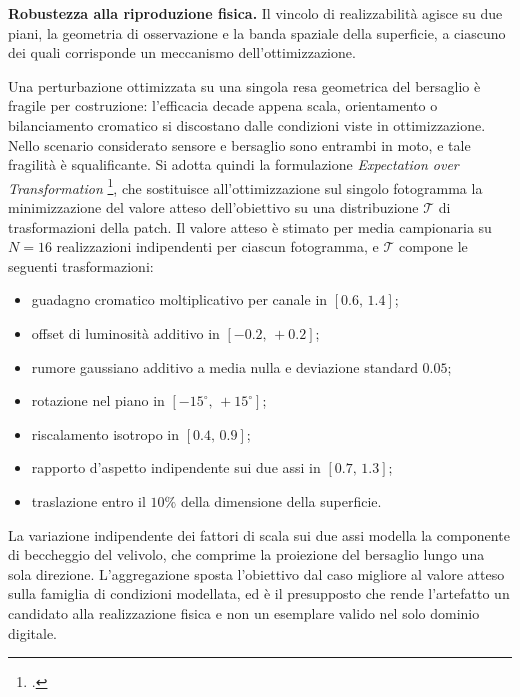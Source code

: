 \documentclass[a4paper,12pt]{report}
\begin{document}
\textbf{Robustezza alla riproduzione fisica.}
\label{sec:eot}
\label{sec:tv}
Il vincolo di realizzabilità agisce su due piani, la geometria di osservazione e
la banda spaziale della superficie, a ciascuno dei quali corrisponde un
meccanismo dell'ottimizzazione.

Una perturbazione ottimizzata su una singola resa geometrica del bersaglio è
fragile per costruzione: l'efficacia decade appena scala, orientamento o
bilanciamento cromatico si discostano dalle condizioni viste in ottimizzazione.
Nello scenario considerato sensore e bersaglio sono entrambi in moto, e tale
fragilità è squalificante. Si adotta quindi la formulazione \textit{Expectation
over Transformation} \footcite{athalye_2018_eot}, che sostituisce
all'ottimizzazione sul singolo fotogramma la minimizzazione del valore atteso
dell'obiettivo su una distribuzione $\mathcal{T}$ di trasformazioni della patch.
Il valore atteso è stimato per media campionaria su $N = 16$ realizzazioni
indipendenti per ciascun fotogramma, e $\mathcal{T}$ compone le seguenti
trasformazioni:
\begin{itemize}
    \item guadagno cromatico moltiplicativo per canale in $[0.6,\, 1.4]$;
    \item offset di luminosità additivo in $[-0.2,\, +0.2]$;
    \item rumore gaussiano additivo a media nulla e deviazione standard $0.05$;
    \item rotazione nel piano in $[-15^\circ,\, +15^\circ]$;
    \item riscalamento isotropo in $[0.4,\, 0.9]$;
    \item rapporto d'aspetto indipendente sui due assi in $[0.7,\, 1.3]$;
    \item traslazione entro il $10\%$ della dimensione della superficie.
\end{itemize}
La variazione indipendente dei fattori di scala sui due assi modella la
componente di beccheggio del velivolo, che comprime la proiezione del bersaglio
lungo una sola direzione. L'aggregazione sposta l'obiettivo dal caso migliore al
valore atteso sulla famiglia di condizioni modellata, ed è il presupposto che
rende l'artefatto un candidato alla realizzazione fisica e non un esemplare
valido nel solo dominio digitale.
\end{document}
